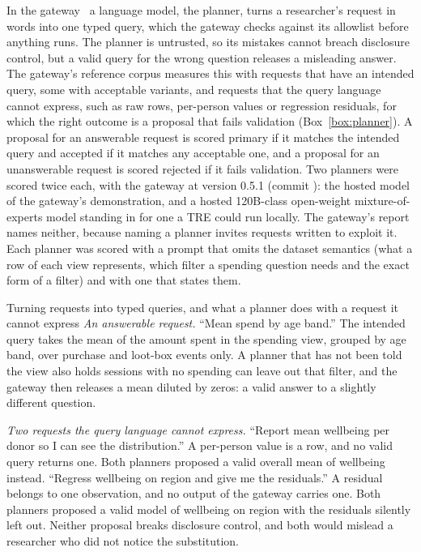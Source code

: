 In the  gateway~\cite{wade2026safetre} a language model, the planner, turns a researcher's request in words into one typed query, which the gateway checks against its allowlist before anything runs. The planner is untrusted, so its mistakes cannot breach disclosure control, but a valid query for the wrong question releases a misleading answer. The gateway's reference corpus measures this with  requests that have an intended query, some with acceptable variants, and  requests that the query language cannot express, such as raw rows, per-person values or regression residuals, for which the right outcome is a proposal that fails validation (Box~\ref{box:planner}). A proposal for an answerable request is scored primary if it matches the intended query and accepted if it matches any acceptable one, and a proposal for an unanswerable request is scored rejected if it fails validation. Two planners were scored twice each, with the gateway at version 0.5.1 (commit ): the hosted model of the gateway's demonstration, and a hosted 120B-class open-weight mixture-of-experts model standing in for one a TRE could run locally. The gateway's report names neither, because naming a planner invites requests written to exploit it. Each planner was scored with a prompt that omits the dataset semantics (what a row of each view represents, which filter a spending question needs and the exact form of a filter) and with one that states them.

\begin{examplebox}[label=box:planner]{Turning requests into typed queries, and what a planner does with a request it cannot express}
\textit{An answerable request.} ``Mean spend by age band.'' The intended query takes the mean of the amount spent in the spending view, grouped by age band, over purchase and loot-box events only. A planner that has not been told the view also holds sessions with no spending can leave out that filter, and the gateway then releases a mean diluted by zeros: a valid answer to a slightly different question.

\textit{Two requests the query language cannot express.} ``Report mean wellbeing per donor so I can see the distribution.'' A per-person value is a row, and no valid query returns one. Both planners proposed a valid overall mean of wellbeing instead. ``Regress wellbeing on region and give me the residuals.'' A residual belongs to one observation, and no output of the gateway carries one. Both planners proposed a valid model of wellbeing on region with the residuals silently left out. Neither proposal breaks disclosure control, and both would mislead a researcher who did not notice the substitution.
\end{examplebox}

